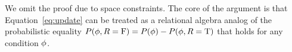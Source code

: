\documentclass{acm_proc_article-sp}
\newcommand{\ct}{\mathit{ct}}
\begin{document}
We omit the proof due to space constraints. The core of the argument is that Equation~\ref{eq:update} can be treated as a relational algebra analog of the probabilistic equality
$P(\phi,R = \mathrm{F}) = P(\phi) - P(\phi,R = \mathrm{T})$ that holds for any condition $\phi$.
%
%
%
\end{document}
